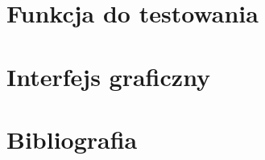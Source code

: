 \documentclass[12pt]{article}
\begin{document}
	\section{Funkcja do testowania}
	
	\section{Interfejs graficzny}
	
	\section{Bibliografia}
	
\end{document}
